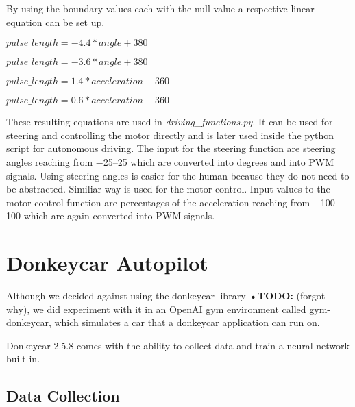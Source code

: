 \documentclass[conference]{IEEEtran}
\begin{document}
By using the boundary values each with the null value a respective linear equation can be set up.
\begin{description}
\setlength\itemsep{.25em}
\item[Left] $ pulse\_length = -4.4 * angle + 380 $
\item[Right] $ pulse\_length = -3.6 * angle + 380 $
\item[Forwards] $ pulse\_length = 1.4 * acceleration + 360 $
\item[Backwards] $ pulse\_length = 0.6 * acceleration + 360 $
\end{description}
These resulting equations are used in \textit{driving\_functions.py}.
It can be used for steering and controlling the motor directly and is later used inside the python script for autonomous driving.
The input for the steering function are steering angles reaching from \numrange{-25}{25} which are converted into degrees and into PWM signals.
Using steering angles is easier for the human because they do not need to be abstracted.
Similiar way is used for the motor control.
Input values to the motor control function are percentages of the acceleration reaching from \numrange{-100}{100} which are again converted into PWM signals.


\section{Donkeycar Autopilot}

Although we decided against using the donkeycar library \textbf{•TODO:} (forgot why), we did experiment with it in an OpenAI gym environment called gym-donkeycar, which simulates a car that a donkeycar application can run on.

Donkeycar 2.5.8 comes with the ability to collect data and train a neural network built-in.

\subsection{Data Collection}
\end{document}
